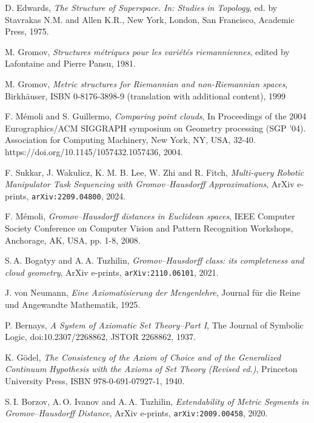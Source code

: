 \documentclass[leqno]{article}
\begin{document}
\begin{thebibliography}{99}
    
 D. Edwards, \emph{The Structure of Superspace. In: Studies in Topology}, ed. by Stavrakas N.M. and Allen K.R., New York, London, San Francisco, Academic Press, 1975.

 M. Gromov, \emph{Structures m\'etriques pour les vari\'et\'es riemanniennes}, edited by Lafontaine and Pierre Pansu, 1981.

 M. Gromov, \emph{Metric structures for Riemannian and non-Riemannian spaces}, Birkh\"auser, ISBN 0-8176-3898-9 (translation with additional content), 1999

F. M\'emoli and S. Guillermo, \emph{Comparing point clouds}, In Proceedings of the 2004 Eurographics/ACM SIGGRAPH symposium on Geometry processing (SGP '04). Association for Computing Machinery, New York, NY, USA, 32-40. https://doi.org/10.1145/1057432.1057436, 2004.

 F. Sukkar, J. Wakulicz, K. M. B. Lee, W. Zhi and R. Fitch, \emph{Multi-query Robotic Manipulator Task Sequencing with Gromov--Hausdorff Approximations}, ArXiv e-prints, \texttt{arXiv:2209.04800}, 2024.

F. M\'emoli, \emph{Gromov--Hausdorff distances in Euclidean spaces}, IEEE Computer Society Conference on Computer Vision and Pattern Recognition Workshops, Anchorage, AK, USA, pp. 1-8, 2008.

S.\,A. Bogatyy and A.\,A. Tuzhilin, \emph{Gromov--Hausdorff class: its completeness and cloud geometry}, ArXiv e-prints,
\texttt{arXiv:2110.06101}, 2021.

J. von Neumann, \emph{Eine Axiomatisierung der Mengenlehre}, Journal f\"ur die Reine und Angewandte Mathematik, 1925.

P. Bernays, \emph{A System of Axiomatic Set Theory--Part I}, The Journal of Symbolic Logic, doi:10.2307/2268862, JSTOR 2268862, 1937.

K. G\"odel, \emph{The Consistency of the Axiom of Choice and of the Generalized Continuum Hypothesis with the Axioms of Set Theory (Revised ed.)}, Princeton University Press,  ISBN 978-0-691-07927-1, 1940.

S.\,I. Borzov, A.\,O. Ivanov and A.\,A. Tuzhilin, \emph{Extendability of Metric Segments in Gromov--Hausdorff Distance}, ArXiv e-prints, \texttt{arXiv:2009.00458}, 2020.


\end{thebibliography}
\end{document}
